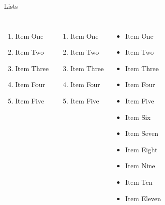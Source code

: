 \documentclass[12pt,aspect=169]{beamer}
\begin{document}
\begin{frame}[t]{Lists}
\scriptsize
\begin{columns}[T]
\begin{enumerate}
	\item Item One
	\item Item Two
	\item Item Three
	\item Item Four
	\item Item Five	
\end{enumerate}

\begin{enumerate}
	\item Item One
	\item Item Two
	\item Item Three
	\item Item Four
	\item Item Five	
\end{enumerate}

\begin{itemize}
	\item Item One
	\item Item Two
	\item Item Three
	\item Item Four
	\item Item Five	
	\item Item Six
	\item Item Seven
	\item Item Eight	
	\item Item Nine
	\item Item Ten
	\item Item Eleven
\end{itemize}

\end{columns}

\end{frame}
\end{document}

